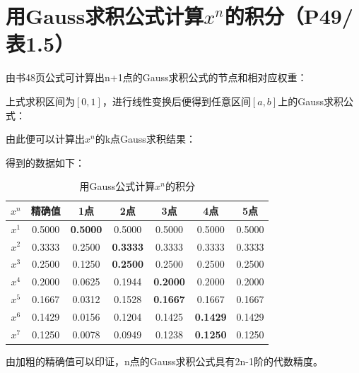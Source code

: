 \documentclass{homework}
\begin{document}
\section{用Gauss求积公式计算$x^n$的积分（P49/表1.5）}
由书48页公式可计算出n+1点的Gauss求积公式的节点和相对应权重：

上式求积区间为$[0,1]$，进行线性变换后便得到任意区间$[a,b]$上的Gauss求积公式：

由此便可以计算出$x^n$的k点Gauss求积结果：

得到的数据如下：
\begin{table}[H]
\centering
\caption{用Gauss公式计算$x^n$的积分}
\begin{tabular}{|c|c|c|c|c|c|c|}
\hline
$x^n$ & 精确值 & 1点 & 2点 & 3点 & 4点 & 5点 \\\hline
$x^1$ & 0.5000 & {\bf 0.5000} & 0.5000 & 0.5000 & 0.5000 & 0.5000 \\\hline
$x^2$ & 0.3333 & 0.2500 & {\bf 0.3333} & 0.3333 & 0.3333 & 0.3333 \\\hline
$x^3$ & 0.2500 & 0.1250 & {\bf 0.2500} & 0.2500 & 0.2500 & 0.2500 \\\hline
$x^4$ & 0.2000 & 0.0625 & 0.1944 & {\bf 0.2000} & 0.2000 & 0.2000 \\\hline
$x^5$ & 0.1667 & 0.0312 & 0.1528 & {\bf 0.1667} & 0.1667 & 0.1667 \\\hline
$x^6$ & 0.1429 & 0.0156 & 0.1204 & 0.1425 & {\bf 0.1429} & 0.1429 \\\hline
$x^7$ & 0.1250 & 0.0078 & 0.0949 & 0.1238 & {\bf 0.1250} & 0.1250 \\\hline
\end{tabular}
\end{table}
由加粗的精确值可以印证，n点的Gauss求积公式具有2n-1阶的代数精度。
\end{document}
